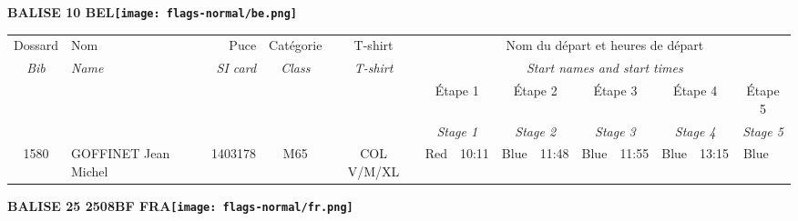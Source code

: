 \documentclass{report}
\begin{document}
\newpage
  \Huge \centering \bfseries BALISE 10  BEL\normalfont \footnotesize \sffamily \hfill \texttt{[image: flags-normal/be.png]} \newline 
  \begin{longtable}{|c|l|r|c|c|*{5}{cc|}}
    Dossard & Nom  & Puce    & Catégorie & T-shirt & \multicolumn{10}{c|}{Nom du départ et heures de départ} \\
    \itshape Bib     & \itshape Name & \itshape SI card & \itshape Class  & \itshape  T-shirt  & \multicolumn{10}{c|}{\itshape Start names and start times} \\
    \hline
    & & & & & \multicolumn{2}{c|}{Étape 1} & \multicolumn{2}{c|}{Étape 2} & \multicolumn{2}{c|}{Étape 3} & \multicolumn{2}{c|}{Étape 4} & \multicolumn{2}{c|}{Étape 5} \\
    & & & & & \multicolumn{2}{c|}{\itshape Stage 1} & \multicolumn{2}{c|}{\itshape Stage 2} & \multicolumn{2}{c|}{\itshape Stage 3} & \multicolumn{2}{c|}{\itshape Stage 4} & \multicolumn{2}{c|}{\itshape Stage 5} \\
    \hline
    1580 & GOFFINET Jean Michel & 1403178 & M65 & COL V/M/XL & Red & 10:11 & Blue & 11:48 & Blue & 11:55 & Blue & 13:15 & Blue &  \\
  \end{longtable}
\newpage
  \Huge \centering \bfseries BALISE 25 2508BF FRA\normalfont \footnotesize \sffamily \hfill \texttt{[image: flags-normal/fr.png]} \newline 
\end{document}
